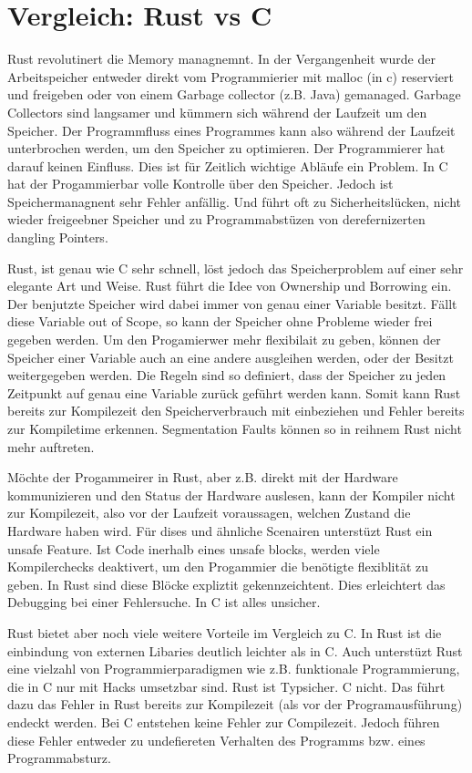 \section{Vergleich: Rust vs C}
Rust revolutinert die Memory managnemnt. In der Vergangenheit wurde der Arbeitspeicher entweder direkt vom Programmierier mit malloc (in c) reserviert und freigeben oder von einem Garbage collector (z.B. Java) gemanaged. Garbage Collectors sind langsamer und kümmern sich während der Laufzeit um den Speicher. Der Programmfluss eines Programmes kann also während der Laufzeit unterbrochen werden, um den Speicher zu optimieren. Der Programmierer hat darauf keinen Einfluss. Dies ist für Zeitlich wichtige Abläufe ein Problem. In C hat der Progammierbar volle Kontrolle über den Speicher. Jedoch ist Speichermanagnent sehr Fehler anfällig. Und führt oft zu Sicherheitslücken, nicht wieder freigeebner Speicher und zu Programmabstüzen von derefernizerten dangling Pointers.

Rust, ist genau wie C sehr schnell, löst jedoch das Speicherproblem auf einer sehr elegante Art und Weise. Rust führt die Idee von Ownership und Borrowing ein. Der benjutzte Speicher wird dabei immer von genau einer Variable besitzt. Fällt diese Variable out of Scope, so kann der Speicher ohne Probleme wieder frei gegeben werden. Um den Progamierwer mehr flexibilait zu geben, können der Speicher einer Variable auch an eine andere ausgleihen werden, oder der Besitzt weitergegeben werden. Die Regeln sind so definiert, dass der Speicher zu jeden Zeitpunkt auf genau eine Variable zurück geführt werden kann. Somit kann Rust bereits zur Kompilezeit den Speicherverbrauch mit einbeziehen und Fehler bereits zur Kompiletime erkennen. Segmentation Faults können so in reihnem Rust nicht mehr auftreten.

Möchte der Progammeirer in Rust, aber z.B. direkt mit der Hardware kommunizieren und den Status der Hardware auslesen, kann der Kompiler nicht zur Kompilezeit, also vor der Laufzeit voraussagen, welchen Zustand die Hardware haben wird. Für dises und ähnliche Scenairen unterstüzt Rust ein unsafe Feature. Ist Code inerhalb eines unsafe blocks, werden viele Kompilerchecks deaktivert, um den Progammier die benötigte flexiblität zu geben. In Rust sind diese Blöcke expliztit gekennzeichtent. Dies erleichtert das Debugging bei einer Fehlersuche. In C ist alles unsicher.

Rust bietet aber noch viele weitere Vorteile im Vergleich zu C. In Rust ist die einbindung von externen Libaries deutlich leichter als in C. Auch unterstüzt Rust eine vielzahl von Programmierparadigmen wie z.B. funktionale Programmierung, die in C nur mit Hacks umsetzbar sind. Rust ist Typsicher. C nicht. Das führt dazu das Fehler in Rust bereits zur Kompilezeit (als vor der Programausführung) endeckt werden. Bei C entstehen keine Fehler zur Compilezeit. Jedoch führen diese Fehler entweder zu undefiereten Verhalten des Programms bzw. eines Programmabsturz.

